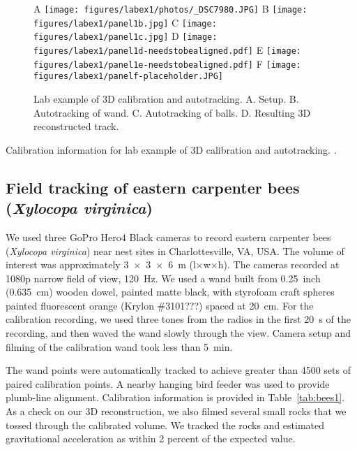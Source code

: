\documentclass[fleqn,10pt]{wlpeerj}
\newcommand{\Xylocopavirginica}{\emph{Xylocopa virginica}}
\begin{document}
\begin{figure}
\caption{Lab example of 3D calibration and autotracking.  A. Setup.  B. Autotracking of wand.  C.  Autotracking of balls.  D.  Resulting 3D reconstructed track. }
\label{fig:labex1}
A \texttt{[image: figures/labex1/photos/\_DSC7980.JPG]}
B \texttt{[image: figures/labex1/panel1b.jpg]}
C \texttt{[image: figures/labex1/panel1c.jpg]}
D \texttt{[image: figures/labex1/panel1d-needstobealigned.pdf]}
E \texttt{[image: figures/labex1/panel1e-needstobealigned.pdf]}
F \texttt{[image: figures/labex1/panelf-placeholder.JPG]}
\end{figure}

\begin{table}
\caption{Calibration information for lab example of 3D calibration and autotracking. .}
\label{tab:labex2}
\begin{center}
\end{center}
\end{table}








\subsection*{Field tracking of eastern carpenter bees (\Xylocopavirginica)}
We used three GoPro Hero4 Black cameras to record eastern carpenter bees (\Xylocopavirginica) near nest sites in Charlottesville, VA, USA.  
The volume of interest was approximately \SI{3x3x6}{\meter} (l$\times$w$\times$h).  The cameras recorded at 1080p narrow field of view, \SI{120}{\hertz}.  We used a wand built from \SI{0.25}{inch} (\SI{0.635}{\centi\meter}) wooden dowel, painted matte black, with styrofoam craft spheres painted fluorescent orange (Krylon \#3101???) spaced at \SI{20}{\centi\meter}.  For the calibration recording, we used three tones from the radios in the first \SI{20}{\second} of the recording, and then waved the wand slowly through the view.  Camera setup and filming of the calibration wand took less than \SI{5}{\minute}.

The wand points were automatically tracked to achieve greater than 4500 sets of paired calibration points.  A nearby hanging bird feeder was used to provide plumb-line alignment.  Calibration information is provided in Table~\ref{tab:bees1}.  As a check on our 3D reconstruction, we also filmed several small rocks that we tossed through the calibrated volume.  We tracked the rocks and estimated gravitational acceleration as within 2 percent of the expected value.  
\end{document}
